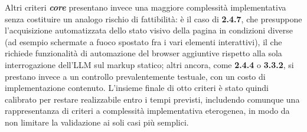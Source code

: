 Altri criteri \textbf{\emph{core}} presentano invece una maggiore complessità implementativa senza costituire un analogo rischio di fattibilità: è il caso di \textbf{2.4.7}, che presuppone l'acquisizione automatizzata dello stato visivo della pagina in condizioni diverse (ad esempio schermate a fuoco spostato fra i vari elementi interattivi), il che richiede funzionalità di automazione del browser aggiuntive rispetto alla sola interrogazione dell'LLM sul markup statico; altri ancora, come \textbf{2.4.4} o \textbf{3.3.2}, si prestano invece a un controllo prevalentemente testuale, con un costo di implementazione contenuto. L'insieme finale di otto criteri è stato quindi calibrato per restare realizzabile entro i tempi previsti, includendo comunque una rappresentanza di criteri a complessità implementativa eterogenea, in modo da non limitare la validazione ai soli casi più semplici.
\FloatBarrier